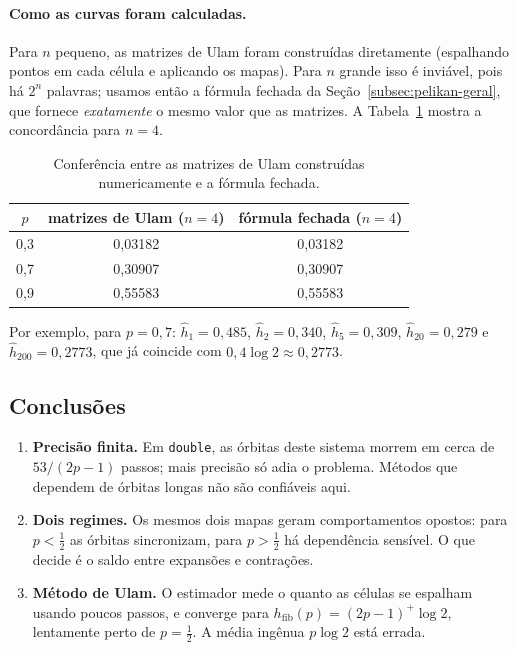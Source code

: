 \paragraph{Como as curvas foram calculadas.} Para $n$ pequeno, as matrizes de Ulam foram
construídas diretamente (espalhando pontos em cada célula e aplicando os mapas). Para $n$
grande isso é inviável, pois há $2^n$ palavras; usamos então a fórmula fechada da
Seção~\ref{subsec:pelikan-geral}, que fornece \emph{exatamente} o mesmo valor que as matrizes.
A Tabela~\ref{tab:pelikan-conf} mostra a concordância para $n=4$.

\begin{table}[ht]
  \centering
  \begin{tabular}{ccc}
    \toprule
    $p$ & matrizes de Ulam ($n=4$) & fórmula fechada ($n=4$)\\
    \midrule
    0,3 & 0,03182 & 0,03182\\
    0,7 & 0,30907 & 0,30907\\
    0,9 & 0,55583 & 0,55583\\
    \bottomrule
  \end{tabular}
  \caption{Conferência entre as matrizes de Ulam construídas numericamente e a fórmula fechada.}
  \label{tab:pelikan-conf}
\end{table}

Por exemplo, para $p=0{,}7$: $\hat h_1=0{,}485$, $\hat h_2=0{,}340$, $\hat h_5=0{,}309$,
$\hat h_{20}=0{,}279$ e $\hat h_{200}=0{,}2773$, que já coincide com $0{,}4\log2\approx0{,}2773$.

\subsection{Conclusões}

\begin{enumerate}
  \item \textbf{Precisão finita.} Em \texttt{double}, as órbitas deste sistema morrem em cerca de
        $53/(2p-1)$ passos; mais precisão só adia o problema. Métodos que dependem de órbitas
        longas não são confiáveis aqui.
  \item \textbf{Dois regimes.} Os mesmos dois mapas geram comportamentos opostos: para
        $p<\tfrac12$ as órbitas sincronizam, para $p>\tfrac12$ há dependência sensível. O que
        decide é o saldo entre expansões e contrações.
  \item \textbf{Método de Ulam.} O estimador mede o quanto as células se espalham usando poucos
        passos, e converge para $h_{\mathrm{fib}}(p)=(2p-1)^+\log2$, lentamente perto de
        $p=\tfrac12$. A média ingênua $p\log2$ está errada.
\end{enumerate}

